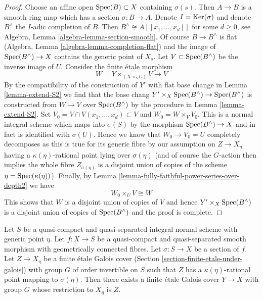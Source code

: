 \begin{proof}
\medskip\noindent
Choose an affine open $\mathop{\mathrm{Spec}}(B) \subset X$ containing $\sigma(s)$.
Then $A \to B$ is a smooth ring map which has a section $\sigma : B \to A$.
Denote $I = \mathop{\mathrm{Ker}}(\sigma)$ and denote $B^\wedge$ the
$I$-adic completion of $B$. Then $B^\wedge \cong A[[x_1, \ldots, x_d]]$
for some $d \geq 0$, see
Algebra, Lemma \ref{algebra-lemma-section-smooth}.
Of course $B \to B^\wedge$ is flat
(Algebra, Lemma \ref{algebra-lemma-completion-flat})
and the image of $\mathop{\mathrm{Spec}}(B^\wedge) \to X$ contains the generic point of $X_s$.
Let $V \subset \mathop{\mathrm{Spec}}(B^\wedge)$ be the inverse image of $U$.
Consider the finite \'etale morphism
$$
W = Y \times_{(X \times_S U)} V \longrightarrow V
$$
By the compatibility of the construction of $Y'$
with flat base change in Lemma \ref{lemma-extend-S2}
we find that the base chang
$Y' \times_X \mathop{\mathrm{Spec}}(B^\wedge) \to \mathop{\mathrm{Spec}}(B^\wedge)$
is constructed from $W \to V$ over $\mathop{\mathrm{Spec}}(B^\wedge)$
by the procedure in Lemma \ref{lemma-extend-S2}.
Set $V_0 = V \cap V(x_1, \ldots, x_d) \subset V$ and $W_0 = W \times_V V_0$.
This is a normal integral scheme which maps into $\sigma(S)$
by the morphism $\mathop{\mathrm{Spec}}(B^\wedge) \to X$ and in fact is identified
with $\sigma(U)$. Hence we know that $W_0 \to V_0 = U$ completely decomposes
as this is true for its generic fibre by our assumption
on $Z \to X_\eta$ having a $\kappa(\eta)$-rational point lying over
$\sigma(\eta)$ (and of course the $G$-action then implies the whole
fibre $Z_{\sigma(\eta)}$ is a disjoint union of copies of
the scheme $\eta = \mathop{\mathrm{Spec}}(\kappa(\eta))$).
Finally, by
Lemma \ref{lemma-fully-faithful-power-series-over-depth2}
we have
$$
W_0 \times_U V \cong W
$$
This shows that $W$ is a disjoint union of copies of $V$
and hence $Y' \times_X \mathop{\mathrm{Spec}}(B^\wedge)$ is a disjoint
union of copies of $\mathop{\mathrm{Spec}}(B^\wedge)$ and the proof is complete.
\end{proof}

\begin{lemma}
\label{lemma-extend-covering-general}
Let $S$ be a quasi-compact and quasi-separated integral normal scheme
with generic point $\eta$. Let $f : X \to S$ be a quasi-compact and
quasi-separated smooth morphism with geometrically connected fibres.
Let $\sigma : S \to X$ be a section of $f$. Let $Z \to X_\eta$ be a
finite \'etale Galois cover (Section \ref{section-finite-etale-under-galois})
with group $G$ of order invertible on $S$ such that
$Z$ has a $\kappa(\eta)$-rational point mapping to $\sigma(\eta)$.
Then there exists a finite \'etale Galois cover $Y \to X$ with group $G$
whose restriction to $X_\eta$ is $Z$.
\end{lemma}

